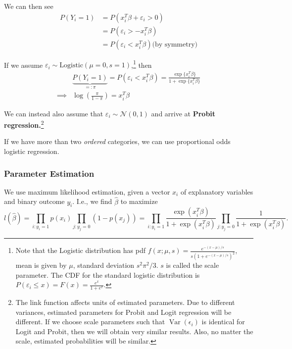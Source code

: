 \documentclass[11pt, %
	oneside, %
	english, %
	onehalfspacing, %
	]{article} %
\numberwithin{equation}{section}
\begin{document}
We can then see
\begin{equation*}
    \begin{aligned}
        P(Y_i = 1) &= P(x_i^T \beta + \varepsilon_i > 0) \\
                &= P( \varepsilon_i > -x_i^T \beta) \\
                &= P( \varepsilon_i < x_i^T \beta) \text{(by symmetry)}
    \end{aligned}
\end{equation*}

If we assume $\varepsilon_i \sim \text{Logistic}(\mu = 0, s = 1)$,\footnote{Note that the Logistic distribution has pdf $f(x ; \mu, s)=\frac{e^{-(x-\mu) / s}}{s\left(1+e^{-(x-\mu) / s}\right)^2}$, mean is given by $\mu$, standard deviation $s^2 \pi^2 / 3$. $s$ is called the scale parameter. The CDF for the standard logistic distribution is  $P\left(\varepsilon_i \leq x\right)=F(x)=\frac{e^x}{1+e^x}$.} then
\begin{align*}
    &\underbrace{P(Y_i = 1)}_{=:\pi} = P( \varepsilon_i < x_i^T \beta) = \frac{\exp \{x_i^T \beta\}}{1+\exp \{x_i^T \beta\}} \\
    \implies & \log \left( \frac{\pi}{1-\pi}\right) = x_i^T \beta
\end{align*}

We can instead also assume that $\varepsilon_i \sim \mathcal{N}(0,1)$ and arrive at \textbf{Probit regression.}\footnote{The link function affects units of estimated parameters. Due to different variances, estimated parameters for Probit and Logit regression will be different. If we choose scale parameters such that $\operatorname{Var}(\epsilon_i)$ is identical for Logit and Probit, then we will obtain very similar results. Also, no matter the scale, estimated probabilities will be similar.}

If we have more than two \emph{ordered} categories, we can use proportional odds logistic regression.

\subsubsection*{Parameter Estimation}

We use maximum likelihood estimation, given a vector $x_i$ of explanatory variables and binary outcome $y_i$. I.e., we find $\hat{\beta}$ to maximize
\begin{equation*}
    l(\hat{\beta})=\prod_{i: y_i=1} p\left(x_i\right) \prod_{j: y_j=0}\left(1-p\left(x_j\right)\right)=\prod_{i: y_i=1} \frac{\exp \left(x_i^T \beta\right)}{1+\exp \left(x_i^T \beta\right)} \prod_{j: y_j=0} \frac{1}{1+\exp \left(x_i^T \beta\right)}.
\end{equation*}
\end{document}
